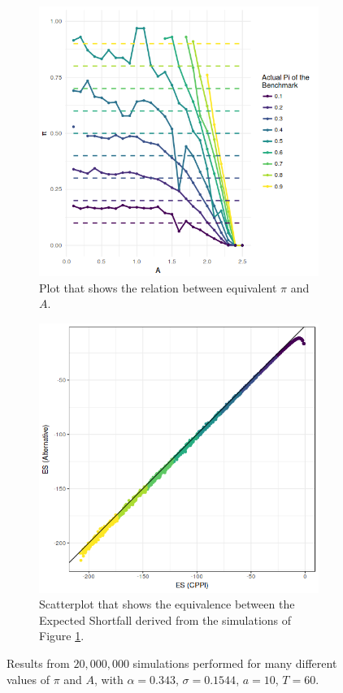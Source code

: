 \begin{figure}
\centering
\begin{subfigure}{.5\textwidth}
    \centering
    \includegraphics[scale=0.5]{./images/pi-A-all-pis.png}
    \caption{Plot that shows the relation between equivalent $\pi$ and $A$.}
    \label{fig:pi-A_all-pis2}
\end{subfigure}%
\begin{subfigure}{.5\textwidth}
    \centering
    \includegraphics[scale=0.5]{./images/es-es_pi.png}
    \caption{Scatterplot that shows the equivalence between the Expected Shortfall derived from the simulations of Figure \ref{fig:pi-A_all-pis2}.}
    \label{fig:es-es_pi2}
\end{subfigure}
\caption{Results from $20,000,000$ simulations performed for many different values of $\pi$ and $A$, with $\alpha = 0.343$, $\sigma = 0.1544$, $a = 10$, $T = 60$.}
\label{fig:test}
\end{figure}


